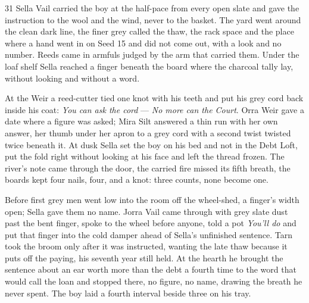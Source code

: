 
\scenebreak

\scenebreak


\scenebreak


\scenebreak

\CRtailpiece
\begin{CRchronicle}{31}
Sella Vail carried the boy at the half-pace from every open slate and gave the instruction to the wool and the wind, never to the basket. The yard went around the clean dark line, the finer grey called the thaw, the rack space and the place where a hand went in on Seed 15 and did not come out, with a look and no number. Reeds came in armfuls judged by the arm that carried them. Under the loaf shelf Sella reached a finger beneath the board where the charcoal tally lay, without looking and without a word.

At the Weir a reed-cutter tied one knot with his teeth and put his grey cord back inside his coat: \emph{You can ask the cord} --- \emph{No more can the Court}. Orra Weir gave a date where a figure was asked; Mira Silt answered a thin run with her own answer, her thumb under her apron to a grey cord with a second twist twisted twice beneath it. At dusk Sella set the boy on his bed and not in the Debt Loft, put the fold right without looking at his face and left the thread frozen. The river’s note came through the door, the carried fire missed its fifth breath, the boards kept four nails, four, and a knot: three counts, none become one.

Before first grey men went low into the room off the wheel-shed, a finger’s width open; Sella gave them no name. Jorra Vail came through with grey slate dust past the bent finger, spoke to the wheel before anyone, told a pot \emph{You’ll do} and put that finger into the cold damper ahead of Sella’s unfinished sentence. Tarn took the broom only after it was instructed, wanting the late thaw because it puts off the paying, his seventh year still held. At the hearth he brought the sentence about an ear worth more than the debt a fourth time to the word that would call the loan and stopped there, no figure, no name, drawing the breath he never spent. The boy laid a fourth interval beside three on his tray.


\end{CRchronicle}
